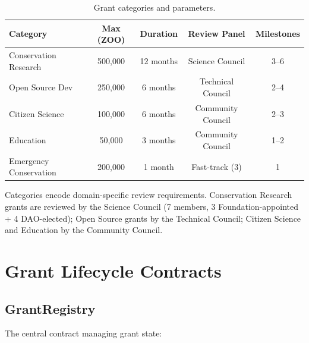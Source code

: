 \documentclass[11pt,letterpaper]{article}
\begin{document}
\begin{table}[h]
\centering
\caption{Grant categories and parameters.}
\label{tab:categories}
\begin{tabular}{p{3cm}cccc}
\toprule
\textbf{Category} & \textbf{Max (ZOO)} & \textbf{Duration} & \textbf{Review Panel} & \textbf{Milestones} \\
\midrule
Conservation Research & 500{,}000 & 12 months & Science Council & 3--6 \\
Open Source Dev & 250{,}000 & 6 months & Technical Council & 2--4 \\
Citizen Science & 100{,}000 & 6 months & Community Council & 2--3 \\
Education & 50{,}000 & 3 months & Community Council & 1--2 \\
Emergency Conservation & 200{,}000 & 1 month & Fast-track (3) & 1 \\
\bottomrule
\end{tabular}
\end{table}

Categories encode domain-specific review requirements. Conservation Research grants are reviewed by the Science Council (7 members, 3 Foundation-appointed + 4 DAO-elected); Open Source grants by the Technical Council; Citizen Science and Education by the Community Council.

\section{Grant Lifecycle Contracts}
\label{sec:contracts}

\subsection{GrantRegistry}

The central contract managing grant state:
\end{document}
